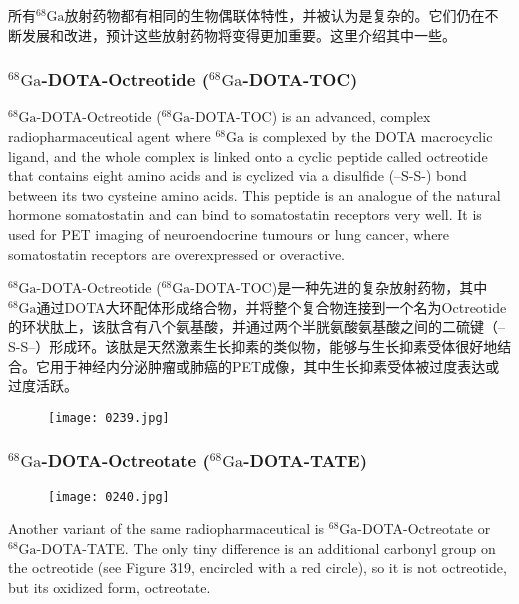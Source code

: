 \documentclass[dvipsnames, svgnames,a4paper,11pt]{article}
\begin{document}
所有\(\mathrm{^{68}Ga}\)放射药物都有相同的生物偶联体特性，并被认为是复杂的。它们仍在不断发展和改进，预计这些放射药物将变得更加重要。这里介绍其中一些。

\subsubsection{\(\mathrm{^{68}Ga}\)-DOTA-Octreotide (\(\mathrm{^{68}Ga}\)-DOTA-TOC)}  
\(\mathrm{^{68}Ga}\)-DOTA-Octreotide (\(\mathrm{^{68}Ga}\)-DOTA-TOC) is an advanced, complex radiopharmaceutical agent where \(\mathrm{^{68}Ga}\) is complexed by the DOTA macrocyclic ligand, and the whole complex is linked onto a cyclic peptide called octreotide that contains eight amino acids and is cyclized via a disulfide (–S-S-) bond between its two cysteine amino acids. This peptide is an analogue of the natural hormone somatostatin and can bind to somatostatin receptors very well. It is used for PET imaging of neuroendocrine tumours or lung cancer, where somatostatin receptors are overexpressed or overactive.

\(\mathrm{^{68}Ga}\)-DOTA-Octreotide (\(\mathrm{^{68}Ga}\)-DOTA-TOC)是一种先进的复杂放射药物，其中\(\mathrm{^{68}Ga}\)通过DOTA大环配体形成络合物，并将整个复合物连接到一个名为Octreotide的环状肽上，该肽含有八个氨基酸，并通过两个半胱氨酸氨基酸之间的二硫键（–S-S–）形成环。该肽是天然激素生长抑素的类似物，能够与生长抑素受体很好地结合。它用于神经内分泌肿瘤或肺癌的PET成像，其中生长抑素受体被过度表达或过度活跃。

\begin{figure}[h]
	\centering
    \texttt{[image: 0239.jpg]}  
     \label{fig318}
\end{figure}

\subsubsection{\(\mathrm{^{68}Ga}\)-DOTA-Octreotate (\(\mathrm{^{68}Ga}\)-DOTA-TATE)}  
\begin{figure}[h]
	\centering
    \texttt{[image: 0240.jpg]}  
     \label{fig319}
\end{figure}

Another variant of the same radiopharmaceutical is \(\mathrm{^{68}Ga}\)-DOTA-Octreotate or \(\mathrm{^{68}Ga}\)-DOTA-TATE. The only tiny difference is an additional carbonyl group on the octreotide (see Figure 319, encircled with a red circle), so it is not octreotide, but its oxidized form, octreotate.
\end{document}
